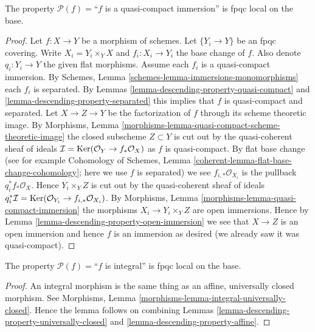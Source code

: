 \begin{lemma}
\label{lemma-descending-property-quasi-compact-immersion}
The property $\mathcal{P}(f) =$``$f$ is a quasi-compact immersion''
is fpqc local on the base.
\end{lemma}

\begin{proof}
Let $f : X \to Y$ be a morphism of schemes.
Let $\{Y_i \to Y\}$ be an fpqc covering.
Write $X_i = Y_i \times_Y X$ and $f_i : X_i \to Y_i$
the base change of $f$. Also denote
$q_i : Y_i \to Y$ the given flat morphisms.
Assume each $f_i$ is a quasi-compact immersion.
By Schemes, Lemma \ref{schemes-lemma-immersions-monomorphisms}
each $f_i$ is separated.
By Lemmas \ref{lemma-descending-property-quasi-compact} and
\ref{lemma-descending-property-separated}
this implies that $f$ is quasi-compact and separated.
Let $X \to Z \to Y$ be the factorization of $f$ through its
scheme theoretic image. By
Morphisms, Lemma \ref{morphisms-lemma-quasi-compact-scheme-theoretic-image}
the closed subscheme $Z \subset Y$ is cut out by the
quasi-coherent sheaf of ideals
$\mathcal{I} = \mathop{\mathrm{Ker}}(\mathcal{O}_Y \to f_*\mathcal{O}_X)$
as $f$ is quasi-compact. By flat base change
(see for example
Cohomology of Schemes, Lemma \ref{coherent-lemma-flat-base-change-cohomology};
here we use $f$ is separated)
we see $f_{i, *}\mathcal{O}_{X_i}$ is the pullback $q_i^*f_*\mathcal{O}_X$.
Hence $Y_i \times_Y Z$ is cut out by the
quasi-coherent sheaf of ideals $q_i^*\mathcal{I} =
\mathop{\mathrm{Ker}}(\mathcal{O}_{Y_i} \to f_{i, *}\mathcal{O}_{X_i})$.
By Morphisms, Lemma \ref{morphisms-lemma-quasi-compact-immersion}
the morphisms $X_i \to Y_i \times_Y Z$
are open immersions. Hence by
Lemma \ref{lemma-descending-property-open-immersion}
we see that $X \to Z$ is an open immersion and
hence $f$ is an immersion as desired
(we already saw it was quasi-compact).
\end{proof}

\begin{lemma}
\label{lemma-descending-property-integral}
The property $\mathcal{P}(f) =$``$f$ is integral''
is fpqc local on the base.
\end{lemma}

\begin{proof}
An integral morphism is the same thing as an affine,
universally closed morphism. See
Morphisms, Lemma \ref{morphisms-lemma-integral-universally-closed}.
Hence the lemma follows on combining
Lemmas \ref{lemma-descending-property-universally-closed}
and \ref{lemma-descending-property-affine}.
\end{proof}

